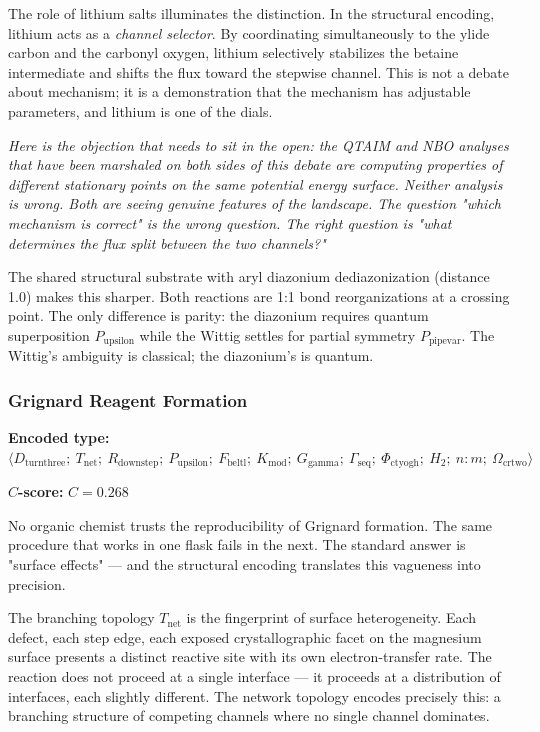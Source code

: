 \documentclass[12pt,a4paper]{article}
\begin{document}
The role of lithium salts illuminates the distinction. In the structural encoding, lithium acts as a \emph{channel selector}. By coordinating simultaneously to the ylide carbon and the carbonyl oxygen, lithium selectively stabilizes the betaine intermediate and shifts the flux toward the stepwise channel. This is not a debate about mechanism; it is a demonstration that the mechanism has adjustable parameters, and lithium is one of the dials.

\emph{Here is the objection that needs to sit in the open: the QTAIM and NBO analyses that have been marshaled on both sides of this debate are computing properties of different stationary points on the same potential energy surface. Neither analysis is wrong. Both are seeing genuine features of the landscape. The question "which mechanism is correct" is the wrong question. The right question is "what determines the flux split between the two channels?"}

The shared structural substrate with aryl diazonium dediazonization (distance 1.0) makes this sharper. Both reactions are 1:1 bond reorganizations at a crossing point. The only difference is parity: the diazonium requires quantum superposition $P_{\text{upsilon}}$ while the Wittig settles for partial symmetry $P_{\text{pipevar}}$. The Wittig's ambiguity is classical; the diazonium's is quantum.

\subsubsection{Grignard Reagent Formation}

\textbf{Encoded type:} $\langle D_{\text{turnthree}};\ T_\textrm{net};\ R_{\text{downstep}};\ P_{\text{upsilon}};\ F_{\text{beltl}};\ K_\textrm{mod};\ G_{\text{gamma}};\ \Gamma_\textrm{seq};\ \Phi_{\text{ctyogh}};\ H_2;\ n{:}m;\ \Omega_{\text{crtwo}} \rangle$

\textbf{$C$-score:} $C = 0.268$

No organic chemist trusts the reproducibility of Grignard formation. The same procedure that works in one flask fails in the next. The standard answer is "surface effects" --- and the structural encoding translates this vagueness into precision.

The branching topology $T_\textrm{net}$ is the fingerprint of surface heterogeneity. Each defect, each step edge, each exposed crystallographic facet on the magnesium surface presents a distinct reactive site with its own electron-transfer rate. The reaction does not proceed at a single interface --- it proceeds at a distribution of interfaces, each slightly different. The network topology encodes precisely this: a branching structure of competing channels where no single channel dominates.
\end{document}
